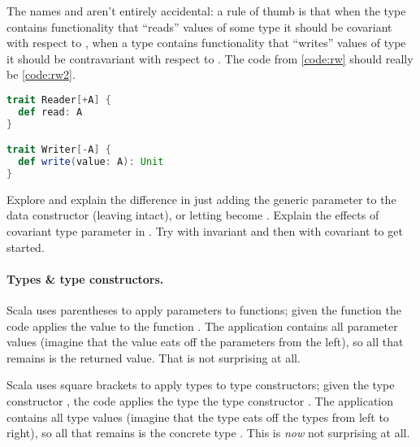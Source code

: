 \documentclass[10 pt]{article}
\begin{document}
The names  and  aren't entirely accidental: a rule of thumb is that when the type contains functionality that ``reads'' values of some type  it should be covariant with respect to , when a type contains functionality that ``writes'' values of type  it should be contravariant with respect to . The code from \autoref{code:rw} should really be \autoref{code:rw2}.

\begin{lstlisting}[caption={Reader and Writer with proper variance}, label={code:rw2}, language=Scala, escapechar=|]
trait Reader[+A] {
  def read: A
}

trait Writer[-A] {
  def write(value: A): Unit
}
\end{lstlisting}

\begin{example}
Explore and explain the difference in just adding the generic parameter to the  data constructor (leaving  intact), or letting  become . Explain the effects of covariant type parameter in . Try  with invariant  and then with covariant  to get started.
\end{example}

\paragraph{Types \& type constructors.} Scala uses parentheses to apply parameters to functions; given the function  the code  applies the value  to the function . The application contains all parameter values (imagine that the value  eats off the parameters from the left), so all that remains is the returned  value. That is not surprising at all.

Scala uses square brackets to apply types to type constructors; given the type constructor , the code  applies the type  the type constructor . The application contains all type values (imagine that the type  eats off the types from left to right), so all that remains is the concrete type . This is \emph{now} not surprising at all.
\end{document}
